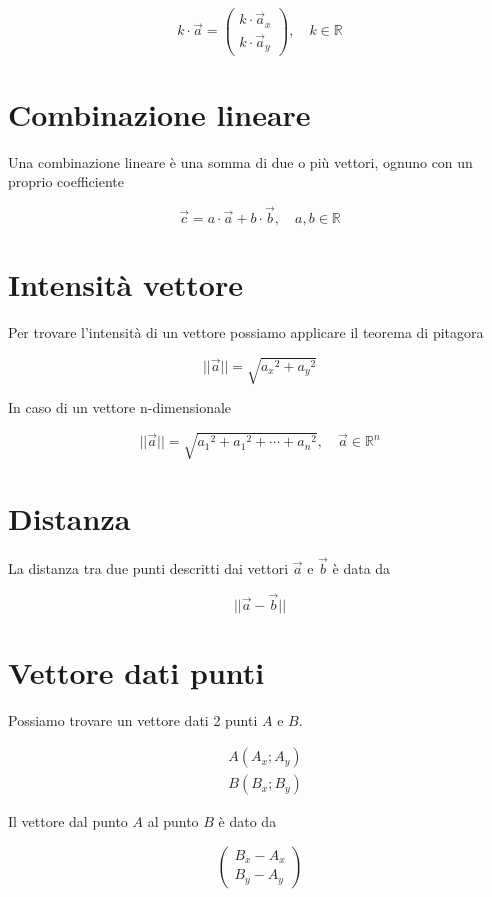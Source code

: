 \documentclass{article}
\begin{document}
\[
    k\cdot\vec{a} =
    \begin{pmatrix}
        k\cdot \vec{a}_x \\
        k\cdot \vec{a}_y
    \end{pmatrix},
    \quad k\in\mathbb{R}
\]

\section{Combinazione lineare}

Una combinazione lineare è una somma di due o più vettori, ognuno con un proprio coefficiente

\[
    \vec{c} = a \cdot\vec{a} + b\cdot\vec{b},
    \quad a,b\in \mathbb{R}
\]

\section{Intensità vettore}

Per trovare l'intensità di un vettore possiamo applicare il teorema di pitagora

\[
    ||\vec{a}|| = \sqrt{{a_x}^2 + {a_y}^2}
\]

In caso di un vettore n-dimensionale

\[
    ||\vec{a}|| = \sqrt{{a_1}^2 + {a_1}^2 + \cdots + {a_n}^2},
    \quad \vec{a}\in\mathbb{R}^n
\]

\section{Distanza}

La distanza tra due punti descritti dai vettori \(\vec{a}\) e \(\vec{b}\) è data da

\[
    ||\vec{a}-\vec{b}||
\]

\section{Vettore dati punti}

Possiamo trovare un vettore dati 2 punti \(A\) e \(B\).

\begin{align*}
    &A(A_x; A_y) \\
    &B(B_x; B_y)
\end{align*}

Il vettore dal punto \(A\) al punto \(B\) è dato da

\[
    \begin{pmatrix}
        B_x - A_x \\
        B_y - A_y
    \end{pmatrix}
\]
\end{document}
